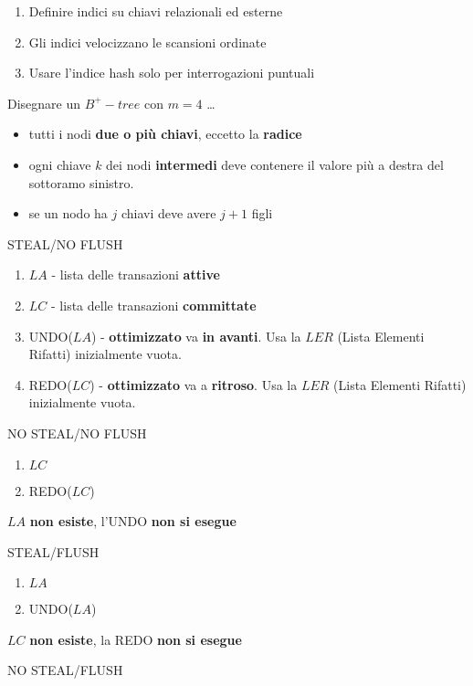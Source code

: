 \documentclass{exam}
\begin{document}
\begin{questions}
\begin{solution}
\begin{enumerate}
        \item Definire indici su chiavi relazionali ed esterne  
        \item Gli indici velocizzano le scansioni ordinate  
        \item Usare l'indice hash solo per interrogazioni puntuali 
        \end{enumerate}
    \end{solution}
    \question Disegnare un $B^+-tree$ con $m=4$ \dots
    \begin{solution}
        \begin{itemize}
            \item tutti i nodi \textbf{due o più chiavi}, eccetto la \textbf{radice}
            \item ogni chiave $k$ dei nodi \textbf{intermedi} deve contenere il valore più a destra del sottoramo sinistro.
            \item se un nodo ha $j$ chiavi deve avere $j+1$ figli
        \end{itemize}
    \end{solution}
    \question STEAL/NO FLUSH
    \begin{solution}
        \begin{enumerate}
            \item $LA$ - lista delle transazioni \textbf{attive}
            \item $LC$ - lista delle transazioni \textbf{committate}
            \item UNDO($LA$) - \textbf{ottimizzato} va \textbf{in avanti}. Usa la $LER$ (Lista Elementi Rifatti) inizialmente vuota.
            \item REDO($LC$) - \textbf{ottimizzato} va a \textbf{ritroso}. Usa la $LER$ (Lista Elementi Rifatti) inizialmente vuota.
        \end{enumerate}
    \end{solution}
    \question NO STEAL/NO FLUSH
    \begin{solution}
        \begin{enumerate}
            \item $LC$
            \item REDO($LC$)
        \end{enumerate}
        $LA$ \textbf{non esiste}, l'UNDO \textbf{non si esegue}
    \end{solution}
    \question STEAL/FLUSH
    \begin{solution}
        \begin{enumerate}
            \item $LA$
            \item UNDO($LA$)
        \end{enumerate}
        $LC$ \textbf{non esiste}, la REDO \textbf{non si esegue}
    \end{solution}
    \question NO STEAL/FLUSH
    \begin{solution}
        

\end{solution}
\end{questions}
\end{document}
